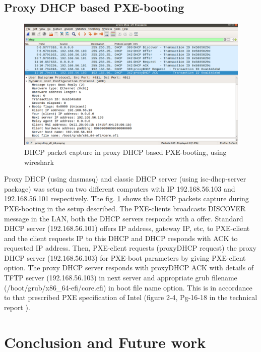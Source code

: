 \documentclass[a4paper,12pt]{article}
\begin{document}
\subsection{ Proxy DHCP based PXE-booting}
\begin{figure}[h!]
  \centering
  \includegraphics[width=1\linewidth]{proxydhcp.png}
  \caption{DHCP packet capture in proxy DHCP based PXE-booting, using wireshark}
  \label{proxydhcp_wireshark}
\end{figure}
Proxy DHCP (using dnsmasq) and classic DHCP server (using isc-dhcp-server package) was setup on two different computers with IP 192.168.56.103 and 192.168.56.101 respectively. The fig. \ref{proxydhcp_wireshark} shows the DHCP packets capture during PXE-booting in the setup described. The PXE-clients broadcasts DISCOVER message in the LAN, both the DHCP servers responds with a offer. Standard DHCP server (192.168.56.101) offers IP address, gateway IP, etc, to PXE-client and the client requests IP to this DHCP and DHCP responds with ACK to requested IP address. Then, PXE-client requests (proxyDHCP request) the proxy DHCP server (192.168.56.103) for PXE-boot parameters by giving PXE-client option. The proxy DHCP server responds with proxyDHCP ACK with details of TFTP server (192.168.56.103) in next server and appropriate grub filename (/boot/grub/x86\_64-efi/core.efi) in boot file name option. This is in accordance to that prescribed PXE specification of Intel (figure 2-4, Pg-16-18 in the technical report \cite{pxe_intel}).



\newpage
\section{\fontsize{16pt}{1em} Conclusion and Future work}
\end{document}
